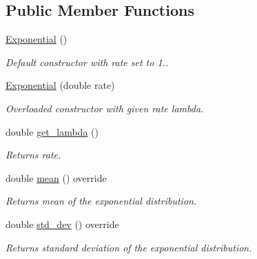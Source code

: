 \subsection*{Public Member Functions}
\begin{DoxyCompactItemize}
\item 
\mbox{\label{classExponential_abc75eaef5b5f89656c4aa406aceb3c27}} 
\hyperlink{classExponential_abc75eaef5b5f89656c4aa406aceb3c27}{Exponential} ()
\begin{DoxyCompactList}\small\item\em Default constructor with rate set to 1.. \end{DoxyCompactList}\item 
\mbox{\label{classExponential_a32dd612030caf5924c498a73f1fc72e8}} 
\hyperlink{classExponential_a32dd612030caf5924c498a73f1fc72e8}{Exponential} (double rate)
\begin{DoxyCompactList}\small\item\em Overloaded constructor with given rate lambda. \end{DoxyCompactList}\item 
\mbox{\label{classExponential_adf6d38352839ea9d7a15b2b98ed98a76}} 
double \hyperlink{classExponential_adf6d38352839ea9d7a15b2b98ed98a76}{get\+\_\+lambda} ()
\begin{DoxyCompactList}\small\item\em Returns rate. \end{DoxyCompactList}\item 
\mbox{\label{classExponential_ac2b44d817a9fd72be0b46cea1003dc28}} 
double \hyperlink{classExponential_ac2b44d817a9fd72be0b46cea1003dc28}{mean} () override
\begin{DoxyCompactList}\small\item\em Returns mean of the exponential distribution. \end{DoxyCompactList}\item 
\mbox{\label{classExponential_a777d6eba34a3476508f37a0bbe1673f0}} 
double \hyperlink{classExponential_a777d6eba34a3476508f37a0bbe1673f0}{std\+\_\+dev} () override
\begin{DoxyCompactList}\small\item\em Returns standard deviation of the exponential distribution. \end{DoxyCompactList}\item 

\end{DoxyCompactItemize}
